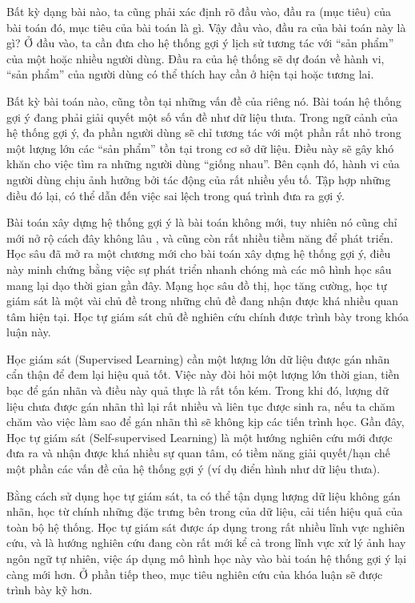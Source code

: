 Bất kỳ dạng bài nào, ta cũng phải xác định rõ đầu vào, đầu ra (mục tiêu) của bài toán đó, mục tiêu của bài toán là gì. Vậy đầu vào, đầu ra của bài toán này là gì? Ở đầu vào, ta cần đưa cho hệ thống gợi ý lịch sử tương tác với ``sản phẩm'' của một hoặc nhiều người dùng. Đầu ra của hệ thống sẽ dự đoán về hành vi, ``sản phẩm'' của người dùng có thể thích hay cần ở hiện tại hoặc tương lai.

Bất kỳ bài toán nào, cũng tồn tại những vấn đề của riêng nó. Bài toán hệ thống gợi ý đang phải giải quyết một số vấn đề  như dữ liệu thưa. Trong ngữ cảnh của hệ thống gợi ý, đa phần người dùng sẽ chỉ tương tác với một phần rất nhỏ trong một lượng lớn các ``sản phẩm'' tồn tại trong cơ sở dữ liệu. Điều này sẽ gây khó khăn cho việc tìm ra những người dùng ``giống nhau''. Bên cạnh đó, hành vi của người dùng chịu ảnh hưởng bởi tác động của rất nhiều yếu tố. Tập hợp những điều đó lại, có thể dẫn đến việc sai lệch trong quá trình đưa ra gợi ý.

Bài toán xây dựng hệ thống gợi ý là bài toán không mới, tuy nhiên nó cũng chỉ mới nở rộ cách đây không lâu \cite{survey:sota-rec-system}, và cũng còn rất nhiều tiềm năng để phát triển. Học sâu đã mở ra một chương mới cho bài toán xây dựng hệ thống gợi ý, điều này minh chứng bằng việc sự phát triển nhanh chóng mà các mô hình học sâu mang lại dạo thời gian gần đây. Mạng học sâu đồ thị, học tăng cường, học tự giám sát là một vài chủ đề trong những chủ đề đang nhận được khá nhiều quan tâm hiện tại. Học tự giám sát chủ đề nghiên cứu chính được trình bày trong khóa luận này.

Học giám sát (Supervised Learning) cần một lượng lớn dữ liệu được gán nhãn cẩn thận để đem lại hiệu quả tốt. Việc này đòi hỏi một lượng lớn thời gian, tiền bạc để gán nhãn và điều này quả thực là rất tốn kém. Trong khi đó, lượng dữ liệu chưa được gán nhãn thì lại rất nhiều và liên tục được sinh ra, nếu ta chăm chăm vào việc làm sao để gán nhãn thì sẽ không kịp các tiến trình học. Gần đây, Học tự giám sát (Self-supervised Learning) là một hướng nghiên cứu mới được đưa ra và nhận được khá nhiều sự quan tâm, có tiềm năng giải quyết/hạn chế một phần các vấn đề của hệ thống gợi ý (ví dụ điển hình như dữ liệu thưa).

Bằng cách sử dụng học tự giám sát, ta có thể tận dụng lượng dữ liệu không gán nhãn, học từ chính những đặc trưng bên trong của dữ liệu, cải tiến hiệu quả của toàn bộ hệ thống. Học tự giám sát được áp dụng trong rất nhiều lĩnh vực nghiên cứu, và là hướng nghiên cứu đang còn rất mới kể cả trong lĩnh vực xử lý ảnh hay ngôn ngữ tự nhiên, việc áp dụng mô hình học này vào bài toán hệ thống gợi ý lại càng mới hơn. Ở phần tiếp theo, mục tiêu nghiên cứu của khóa luận sẽ được trình bày kỹ hơn.

